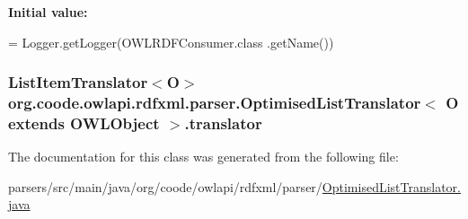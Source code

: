 {\bfseries Initial value\-:}
\begin{DoxyCode}
= Logger.getLogger(OWLRDFConsumer.class
            .getName())
\end{DoxyCode}
\hypertarget{classorg_1_1coode_1_1owlapi_1_1rdfxml_1_1parser_1_1_optimised_list_translator_3_01_o_01extends_01_o_w_l_object_01_4_a521d828eda75fbc3a5bf878b0bb98286}{
\subsubsection[{translator}]{\setlength{\rightskip}{0pt plus 5cm}List\-Item\-Translator$<$O$>$ org.\-coode.\-owlapi.\-rdfxml.\-parser.\-Optimised\-List\-Translator$<$ O extends {\bf O\-W\-L\-Object} $>$.translator\hspace{0.3cm}{\ttfamily [private]}}}\label{classorg_1_1coode_1_1owlapi_1_1rdfxml_1_1parser_1_1_optimised_list_translator_3_01_o_01extends_01_o_w_l_object_01_4_a521d828eda75fbc3a5bf878b0bb98286}


The documentation for this class was generated from the following file\-:\begin{DoxyCompactItemize}
\item 
parsers/src/main/java/org/coode/owlapi/rdfxml/parser/\hyperlink{_optimised_list_translator_8java}{Optimised\-List\-Translator.\-java}\end{DoxyCompactItemize}
